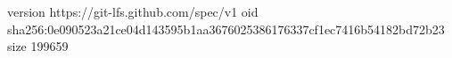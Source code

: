 version https://git-lfs.github.com/spec/v1
oid sha256:0e090523a21ce04d143595b1aa3676025386176337cf1ec7416b54182bd72b23
size 199659
